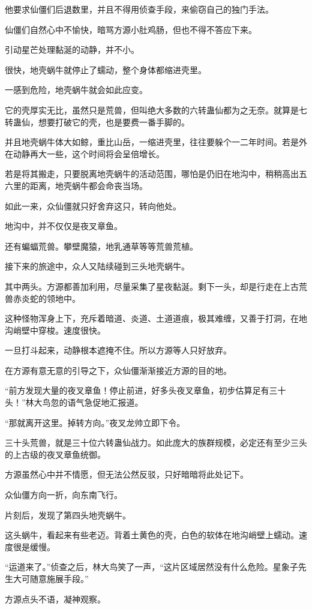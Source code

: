 \begin{this_body}
他要求仙僵们后退数里，并且不得用侦查手段，来偷窃自己的独门手法。

仙僵们自然心中不愉快，暗骂方源小肚鸡肠，但也不得不答应下来。

引动星芒处理黏涎的动静，并不小。

很快，地壳蜗牛就停止了蠕动，整个身体都缩进壳里。

一感到危险，地壳蜗牛就会如此应变。

它的壳厚实无比，虽然只是荒兽，但叫绝大多数的六转蛊仙都为之无奈。就算是七转蛊仙，想要打破它的壳，也是要费一番手脚的。

并且地壳蜗牛体大如鲸，重比山岳，一缩进壳里，往往要躲个一二年时间。若是外在动静再大一些，这个时间将会呈倍增长。

若是将其搬走，只要脱离地壳蜗牛的活动范围，哪怕是仍旧在地沟中，稍稍高出五六里的距离，地壳蜗牛都会命丧当场。

如此一来，众仙僵就只好舍弃这只，转向他处。

地沟中，并不仅仅是夜叉章鱼。

还有蝙蝠荒兽。攀壁魔猿，地乳通草等等荒兽荒植。

接下来的旅途中，众人又陆续碰到三头地壳蜗牛。

其中两头。方源都善加利用，尽量采集了星夜黏涎。剩下一头，却是行走在上古荒兽赤炎蛇的领地中。

这种怪物浑身上下，充斥着暗道、炎道、土道道痕，极其难缠，又善于打洞，在地沟峭壁中穿梭。速度很快。

一旦打斗起来，动静根本遮掩不住。所以方源等人只好放弃。

在方源有意无意的引导之下，众仙僵渐渐接近方源的目的地。

“前方发现大量的夜叉章鱼！停止前进，好多头夜叉章鱼，初步估算足有三十头！”林大鸟忽的语气急促地汇报道。

“那就离开这里。掉转方向。”夜叉龙帅立即下令。

三十头荒兽，就是三十位六转蛊仙战力。如此庞大的族群规模，必定还有至少三头的上古级的夜叉章鱼统御。

方源虽然心中并不情愿，但无法公然反驳，只好暗暗将此处记下。

众仙僵方向一折，向东南飞行。

片刻后，发现了第四头地壳蜗牛。

这头蜗牛，看起来有些老迈。背着土黄色的壳，白色的软体在地沟峭壁上蠕动。速度很是缓慢。

“运道来了。”侦查之后，林大鸟笑了一声，“这片区域居然没有什么危险。星象子先生大可随意施展手段。”

方源点头不语，凝神观察。


\end{this_body}
